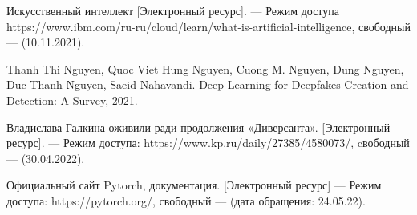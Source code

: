 \begin{thebibliography}{0}
	Искусственный интеллект [Электронный ресурс]. — Режим доступа https://www.ibm.com/ru-ru/cloud/learn/what-is-artificial-intelligence, свободный — (10.11.2021).
	
	Thanh Thi Nguyen, Quoc Viet Hung Nguyen, Cuong M. Nguyen, Dung Nguyen, Duc Thanh Nguyen, Saeid Nahavandi. Deep Learning for Deepfakes Creation and
	Detection: A Survey, 2021.
	
	 Владислава Галкина оживили ради продолжения «Диверсанта». [Электронный ресурс]. — Режим доступа: https://www.kp.ru/daily/27385/4580073/, cвободный — (30.04.2022).
	
	 Официальный сайт Pytorch, документация. [Электронный ресурс] — Режим доступа: https://pytorch.org/, свободный — (дата обращения: 24.05.22).
	
\end{thebibliography}
